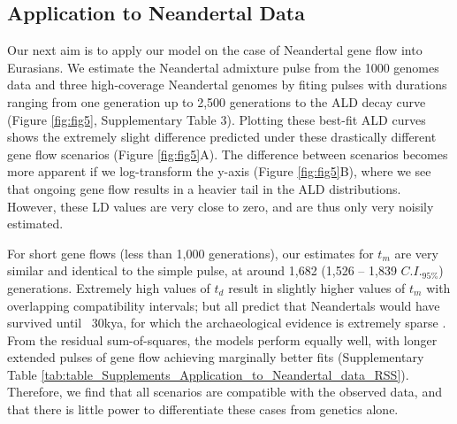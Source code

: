 \documentclass[11pt]{article}
\begin{document}
\subsection{Application to Neandertal Data}
Our next aim is to apply our model on the case of Neandertal gene flow into Eurasians. We estimate the Neandertal admixture pulse from the 1000 genomes data \citep{the_1000_genomes_project_consortium_global_2015} and three high-coverage Neandertal genomes \citep{prufer_complete_2013, prufer_high-coverage_2017, mafessoni_high_coverage_2020} by fiting pulses with durations ranging from one generation up to 2,500 generations to the ALD decay curve (Figure \ref{fig:fig5}, Supplementary Table 3). Plotting these best-fit ALD curves shows the extremely slight difference predicted under these drastically different gene flow scenarios (Figure \ref{fig:fig5}A). The difference between scenarios becomes more apparent if we log-transform the y-axis (Figure \ref{fig:fig5}B), where we see that ongoing gene flow results in a heavier tail in the ALD distributions. However, these LD values are very close to zero, and are thus only very noisily estimated. 

For short gene flows (less than 1,000 generations), our estimates for $t_m$ are very similar and identical to the simple pulse, at around 1,682 (1,526 -- 1,839 $C.I._{95\%}$) generations. Extremely high values of $t_d$ result in slightly higher values of $t_m$ with overlapping compatibility intervals; but all predict that Neandertals would have survived until ~30kya, for which the archaeological evidence is extremely sparse \citep{hublin_last_2017}.  From the residual sum-of-squares, the models perform equally well, with longer extended pulses of gene flow achieving marginally better fits (Supplementary Table \ref{tab:table_Supplements_Application_to_Neandertal_data_RSS}). Therefore, we find that all scenarios are compatible with the observed data, and that there is little power to differentiate these cases from genetics alone.  
\end{document}
